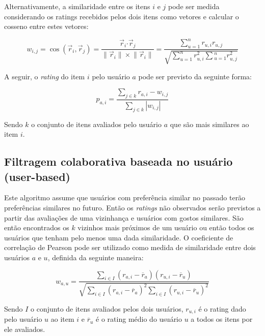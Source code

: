 \documentclass[12pt,a4paper,header]{abnt}
\begin{document}
Alternativamente, a similaridade entre os itens $i$ e $j$ pode ser medida considerando os ratings recebidos pelos dois itens como vetores e calcular o cosseno entre estes vetores\cite{sarwar2001item}:

\begin{equation}
w_{i, j} = \cos({\vec{r}_i, \vec{r}_j}) = \frac{\vec{r}_i \boldsymbol{\cdot} \vec{r}_j}{\lVert \vec{r}_i\rVert \times \lVert \vec{r}_i\rVert} = \frac{\sum_{u=1}^{n}{r_{u, i} r_{u, j}}}{\sqrt{\sum_{u=1}^{n}{r^2_{u, i}} \sum{_{u=1}^{n}{r^2_{u, j}}}}}
\end{equation}

A seguir, o \textit{rating} do item $i$ pelo usuário $a$ pode ser previsto da seguinte forma\cite{melville2011recommender}:

\begin{equation}
p_{a, i} = \frac{\sum_{j \in k}{r_{a, i} - w_{i, j}}}{\sum_{j \in k}{\left|w_{i, j}\right|}}
\end{equation}

Sendo $k$ o conjunto de itens avaliados pelo usuário $a$ que são mais similares ao item $i$.

\subsection{Filtragem colaborativa baseada no usuário (user-based)}

Este algoritmo assume que usuários com preferência similar no passado terão preferências similares no futuro. Então os \textit{ratings} não observados serão previstos a partir das avaliações de uma vizinhança e usuários com gostos similares\cite{hahsler2015recommenderlab}. São então encontrados os $k$ vizinhos mais próximos de um usuário ou então todos os usuários que tenham pelo menos uma dada similaridade. O coeficiente de correlação de Pearson pode ser utilizado como medida de similaridade entre dois usuários $a$ e $u$, definida da seguinte maneira\cite{melville2011recommender}:

\begin{equation}
w_{a, u} = \frac{\sum_{i \in I}{(r_{a, i} - \overline{r}_a ) ( r_{u, i} - \overline{r}_u )}}{\sqrt{\sum_{i \in I}{(r_{a, i} - \overline{r}_a )^2} \sum_{i \in I}{(r_{u, i} - \overline{r}_u )^2}}}
\end{equation}

Sendo $I$ o conjunto de itens avaliados pelos dois usuários, $r_{u, i}$ é o rating dado pelo usuário $u$ ao item $i$ e $\overline{r}_u$ é o rating médio do usuário $u$ a todos os itens por ele avaliados. 
\end{document}

